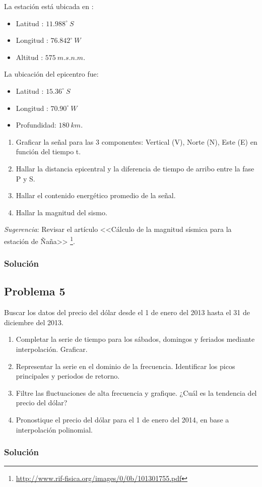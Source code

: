 \documentclass[a4paper,12pt,final]{article}
\begin{document}
      \noindent La estación está ubicada en :

      \begin{itemize}
        \item Latitud  : $11.988^\circ\ S$
        \item Longitud : $76.842^\circ\ W$
        \item Altitud  : $575\ m.s.n.m$.
      \end{itemize}

      \noindent La ubicación del epicentro fue:

      \begin{itemize}
        \item Latitud    : $15.36^\circ\ S$
        \item Longitud   : $70.90^\circ\ W$
        \item Profundidad: $180\ km$.
      \end{itemize}

      \begin{enumerate}[label=\alph*)]
        \item Graficar la señal para las 3 componentes: Vertical (V), Norte (N), Este (E) en función del tiempo t.
        \item Hallar la distancia epicentral y la diferencia de tiempo de arribo entre la fase P y S.
        \item Hallar el contenido energético promedio de la señal.
        \item Hallar la magnitud del sismo.
      \end{enumerate}

      \noindent \emph{Sugerencia}: Revisar el artículo <<Cálculo de la magnitud sísmica para la estación de Ñaña>>
      \footnote{\url{http://www.rif-fisica.org/images/0/0b/101301755.pdf}}.

    \subsubsection*{Solución}

  \newpage
  \subsection*{Problema 5}
    \noindent Buscar los datos del precio del dólar desde el 1 de enero del 2013
      hasta el 31 de diciembre del 2013.

      \begin{enumerate}[label=\alph*)]
        \item Completar la serie de tiempo para los sábados, domingos y feriados mediante interpolación. Graficar.
        \item Representar la serie en el dominio de la frecuencia. Identificar los picos principales y periodos de retorno.
        \item Filtre las fluctuaciones de alta frecuencia y grafique. ¿Cuál es la tendencia del precio del dólar?
        \item Pronostique el precio del dólar para el 1 de enero del 2014, en base a interpolación polinomial.
      \end{enumerate}

    \subsubsection*{Solución}
\end{document}
